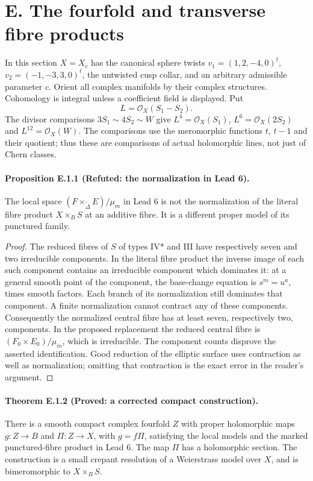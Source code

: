\section{E. The fourfold and transverse fibre products}

In this section $X=X_c$ has the canonical sphere twists
$v_1=(1,2,-4,0)^t$, $v_2=(-1,-3,3,0)^t$, the untwisted cusp collar,
and an arbitrary admissible parameter $c$.  Orient all complex manifolds by
their complex structures.  Cohomology is integral unless a coefficient
field is displayed.  Put
\[
 L=\mathcal O_X(S_1-S_2).
\]
The divisor comparisons $3S_1\sim4S_2\sim W$ give
$L^4=\mathcal O_X(S_1)$, $L^6=\mathcal O_X(2S_2)$ and
$L^{12}=\mathcal O_X(W)$.  The comparisons use the meromorphic functions
$t$, $t-1$ and their quotient; thus these are comparisons of actual
holomorphic lines, not just of Chern classes.

\paragraph{Proposition E.1.1 (Refuted: the normalization in Lead 6).}
The local space $(F\times_{\widetilde\Delta}E)/\mu_m$ in Lead 6 is not
the normalization of the literal fibre product $X\times_B S$ at an
additive fibre.  It is a different proper model of its punctured family.

\begin{proof}
The reduced fibres of $S$ of types IV* and III have respectively seven
and two irreducible components.  In the literal fibre product the inverse
image of each such component contains an irreducible component which
dominates it: at a general smooth point of the component, the base-change
equation is $s^m=u^a$, times smooth factors.  Each branch of its
normalization still dominates that component.  A finite normalization
cannot contract any of these components.  Consequently the normalized
central fibre has at least seven, respectively two, components.  In the
proposed replacement the reduced central fibre is
$(F_0\times E_0)/\mu_m$, which is irreducible.  The component counts
disprove the asserted identification.  Good reduction of the elliptic
surface uses contraction as well as normalization; omitting that
contraction is the exact error in the reader's argument.
\end{proof}

\paragraph{Theorem E.1.2 (Proved: a corrected compact construction).}
There is a smooth compact complex fourfold $Z$ with proper holomorphic
maps $g:Z\to B$ and $\Pi:Z\to X$, with $g=f\Pi$, satisfying the local
models and the marked punctured-fibre product in Lead 6.  The map $\Pi$
has a holomorphic section.  The construction is a small crepant
resolution of a Weierstrass model over $X$, and is bimeromorphic to
$X\times_B S$.

